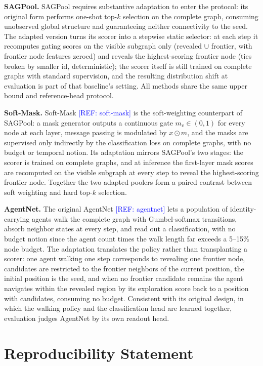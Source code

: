 \documentclass{article}
\newcommand{\refadd}[1]{\textcolor{blue}{[REF: #1]}}
\begin{document}
\textbf{SAGPool.} SAGPool requires substantive adaptation to enter the protocol: its original form performs one-shot top-$k$ selection on the complete graph, consuming unobserved global structure and guaranteeing neither connectivity to the seed. The adapted version turns its scorer into a stepwise static selector: at each step it recomputes gating scores on the visible subgraph only (revealed $\cup$ frontier, with frontier node features zeroed) and reveals the highest-scoring frontier node (ties broken by smaller id, deterministic); the scorer itself is still trained on complete graphs with standard supervision, and the resulting distribution shift at evaluation is part of that baseline's setting. All methods share the same upper bound and reference-head protocol.

\textbf{Soft-Mask.} Soft-Mask \refadd{soft-mask} is the soft-weighting counterpart of SAGPool: a mask generator outputs a continuous gate $m_v\in(0,1)$ for every node at each layer, message passing is modulated by $x\odot m$, and the masks are supervised only indirectly by the classification loss on complete graphs, with no budget or temporal notion. Its adaptation mirrors SAGPool's two stages: the scorer is trained on complete graphs, and at inference the first-layer mask scores are recomputed on the visible subgraph at every step to reveal the highest-scoring frontier node. Together the two adapted poolers form a paired contrast between soft weighting and hard top-$k$ selection.

\textbf{AgentNet.} The original AgentNet \refadd{agentnet} lets a population of identity-carrying agents walk the complete graph with Gumbel-softmax transitions, absorb neighbor states at every step, and read out a classification, with no budget notion since the agent count times the walk length far exceeds a 5--15\% node budget. The adaptation translates the policy rather than transplanting a scorer: one agent walking one step corresponds to revealing one frontier node, candidates are restricted to the frontier neighbors of the current position, the initial position is the seed, and when no frontier candidate remains the agent navigates within the revealed region by its exploration score back to a position with candidates, consuming no budget. Consistent with its original design, in which the walking policy and the classification head are learned together, evaluation judges AgentNet by its own readout head.

\section*{Reproducibility Statement}
\end{document}
